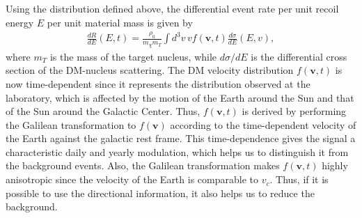 \documentclass[12pt,twoside,book]{article}
\begin{document}
Using the distribution defined above, the differential event rate per unit recoil energy $E$ per unit material mass is given by \cite{Lewin:1995rx}
\begin{align}
  \frac{d R}{d E} (E,t) = \frac{\rho_0}{m_\chi m_T} \int d^3 v\, v f(\bm{v}, t)
  \frac{d \sigma}{d E} (E, v),
  \label{eq:rate}
\end{align}
where $m_T$ is the mass of the target nucleus, while $d\sigma / dE$ is the differential cross section of the DM-nucleus scattering.
The DM velocity distribution $f(\bm{v}, t)$ is now time-dependent since it represents the distribution observed at the laboratory, which is affected by the motion of the Earth around the Sun and that of the Sun around the Galactic Center.
Thus, $f(\bm{v}, t)$ is derived by performing the Galilean transformation to $f(\bm{v})$ according to the time-dependent velocity of the Earth against the galactic rest frame.
This time-dependence gives the signal a characteristic daily and yearly modulation, which helps us to distinguish it from the background events.
Also, the Galilean transformation makes $f(\bm{v}, t)$ highly anisotropic since the velocity of the Earth is comparable to $v_c$.
Thus, if it is possible to use the directional information, it also helps us to reduce the background.
\end{document}
